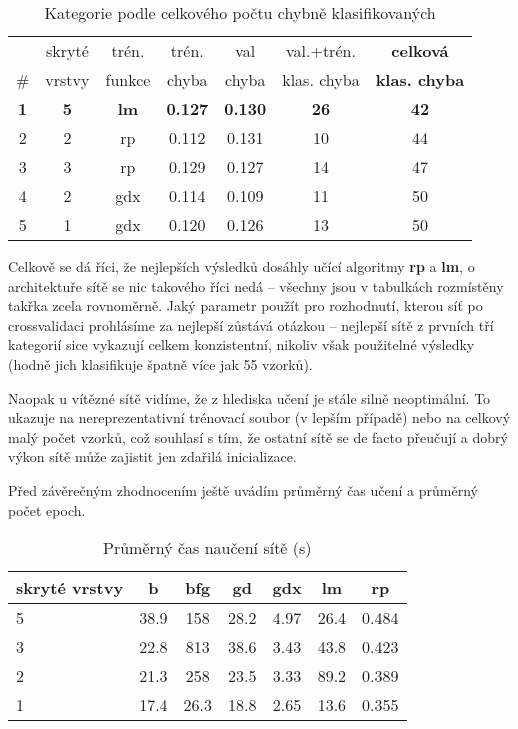 \documentclass[journal]{IEEEtrancz}
\begin{document}
\begin{table}[h]
  \centering
  \caption{Kategorie podle celkového počtu chybně klasifikovaných}
  \begin{tabular}{|c|c|c|c|c|c|c|}
  \hline
   &skryté & trén. & trén. & val & val.+trén. & \textbf{celková} \\
  \#  &vrstvy & funkce & chyba & chyba & klas. chyba & \textbf{klas. chyba} \\
  \hline
  \hline
\textbf{1}&\textbf{5}&\textbf{lm}&\textbf{0.127}&\textbf{0.130}&\textbf{26}&\textbf{42}\\
2&2&rp&0.112&0.131&10&44\\
3&3&rp&0.129&0.127&14&47\\
4&2&gdx&0.114&0.109&11&50\\
5&1&gdx&0.120&0.126&13&50\\
  \hline
  \end{tabular}
  \label{tab:klas}
\end{table}

Celkově se dá říci, že nejlepších výsledků dosáhly učící algoritmy \textbf{rp} a \textbf{lm}, o architektuře sítě se nic takového říci nedá -- všechny jsou v tabulkách rozmístěny takřka zcela rovnoměrně. Jaký parametr použít pro rozhodnutí, kterou síť po crossvalidaci prohlásíme za nejlepší zůstává otázkou -- nejlepší sítě z prvních tří kategorií sice vykazují celkem konzistentní, nikoliv však použitelné výsledky (hodně jich klasifikuje špatně více jak 55 vzorků). 

Naopak u vítězné sítě vidíme, že z hlediska učení je stále silně neoptimální. To ukazuje na nereprezentativní trénovací soubor (v lepším případě) nebo na celkový malý počet vzorků, což souhlasí s tím, že ostatní sítě se de facto přeučují a dobrý výkon sítě může zajistit jen zdařilá inicializace.

Před závěrečným zhodnocením ještě uvádím průměrný čas učení a průměrný počet epoch.
\begin{table}[h]
  \centering
  \caption{Průměrný čas naučení sítě (s)}
  \begin{tabular}{|l||c|c|c|c|c|c|}
  \hline
  skryté vrstvy & b & bfg & gd & gdx & lm & rp\\
   \hline
  \hline
  5&38.9&158&28.2&4.97&26.4&0.484\\
3&22.8&813&38.6&3.43&43.8&0.423\\
2&21.3&258&23.5&3.33&89.2&0.389\\
1&17.4&26.3&18.8&2.65&13.6&0.355\\
  \hline
  \end{tabular}
  \label{tab:klas}
\end{table}
\end{document}
